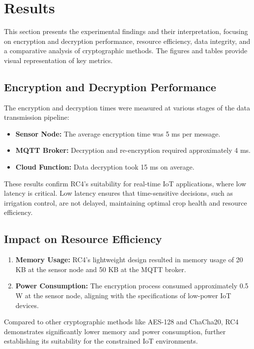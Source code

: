 \documentclass[runningheads]{llncs}
\begin{document}
\section{Results}

This section presents the experimental findings and their interpretation, focusing on encryption and decryption performance, resource efficiency, data integrity, and a comparative analysis of cryptographic methods. The figures and tables provide visual representation of key metrics.

\subsection{Encryption and Decryption Performance}

The encryption and decryption times were measured at various stages of the data transmission pipeline:
\begin{itemize}
    \item \textbf{Sensor Node:} The average encryption time was 5 ms per message.
    \item \textbf{MQTT Broker:} Decryption and re-encryption required approximately 4 ms.
    \item \textbf{Cloud Function:} Data decryption took 15 ms on average.
\end{itemize}
These results confirm RC4's suitability for real-time IoT applications, where low latency is critical. Low latency ensures that time-sensitive decisions, such as irrigation control, are not delayed, maintaining optimal crop health and resource efficiency.

\subsection{Impact on Resource Efficiency}

\begin{enumerate}
    \item \textbf{Memory Usage:} RC4's lightweight design resulted in memory usage of 20 KB at the sensor node and 50 KB at the MQTT broker.
    \item \textbf{Power Consumption:} The encryption process consumed approximately 0.5 W at the sensor node, aligning with the specifications of low-power IoT devices.
\end{enumerate}
Compared to other cryptographic methods like AES-128 and ChaCha20, RC4 demonstrates significantly lower memory and power consumption, further establishing its suitability for the constrained IoT environments.
\end{document}
